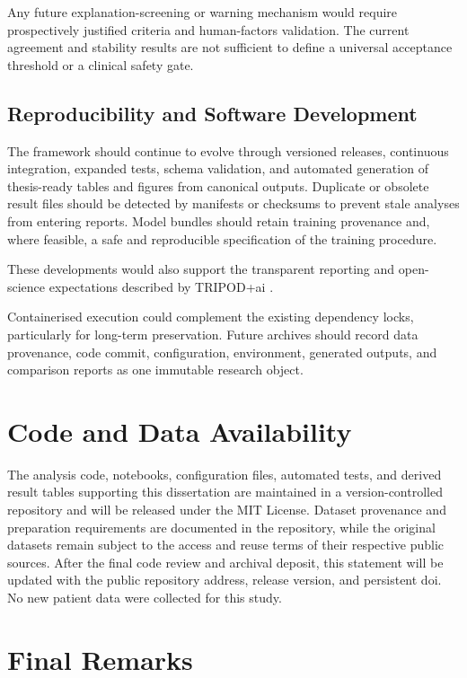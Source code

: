 Any future explanation-screening or warning mechanism would require prospectively justified criteria and human-factors validation. The current agreement and stability results are not sufficient to define a universal acceptance threshold or a clinical safety gate.

\subsection{Reproducibility and Software Development}

The framework should continue to evolve through versioned releases, continuous integration, expanded tests, schema validation, and automated generation of thesis-ready tables and figures from canonical outputs. Duplicate or obsolete result files should be detected by manifests or checksums to prevent stale analyses from entering reports. Model bundles should retain training provenance and, where feasible, a safe and reproducible specification of the training procedure.

These developments would also support the transparent reporting and open-science expectations described by TRIPOD+\gls{ai} \citep{collins_tripodai_2024}.

Containerised execution could complement the existing dependency locks, particularly for long-term preservation. Future archives should record data provenance, code commit, configuration, environment, generated outputs, and comparison reports as one immutable research object.

\section{Code and Data Availability}

The analysis code, notebooks, configuration files, automated tests, and derived result tables supporting this dissertation are maintained in a version-controlled repository and will be released under the MIT License. Dataset provenance and preparation requirements are documented in the repository, while the original datasets remain subject to the access and reuse terms of their respective public sources. After the final code review and archival deposit, this statement will be updated with the public repository address, release version, and persistent \gls{doi}. No new patient data were collected for this study.

\section{Final Remarks}

